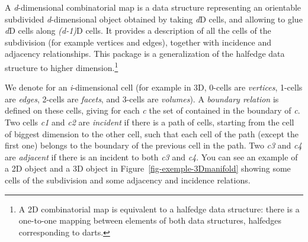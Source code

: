 A \emph{d}-dimensional combinatorial map is a data structure
representing an orientable subdivided \emph{d}-dimensional object
obtained by taking \emph{d}D cells, and allowing to glue \emph{d}D
cells along \emph{(d-1)}D cells.  It provides a description of all the
cells of the subdivision (for example vertices and edges), together
with incidence and adjacency relationships. This package is a
generalization of the halfedge data structure to higher
dimension.\footnote{A 2D combinatorial map is equivalent to a halfedge
  data structure: there is a one-to-one mapping between elements of
  both data structures, halfedges corresponding to darts.}

We denote  for an \emph{i}-dimensional cell (for example in 3D,
0-cells are \emph{vertices}, 1-cells are \emph{edges}, 2-cells are
\emph{facets}, and 3-cells are \emph{volumes}). A \emph{boundary
  relation} is defined on these cells, giving for each  \emph{c}
the set of  contained in the boundary of \emph{c}.  Two cells
\emph{c1} and \emph{c2} are \emph{incident} if there is a path of cells,
starting from the cell of biggest dimension to the other cell, such
that each cell of the path (except the first one) belongs to the
boundary of the previous cell in the path. Two  \emph{c3} and \emph{c4} are \emph{adjacent} if there is an  incident to both \emph{c3}
and \emph{c4}.  You can see an example of a 2D object and a 3D object in
Figure~\ref{fig-exemple-3Dmanifold} showing some cells of the
subdivision and some adjacency and incidence relations.
